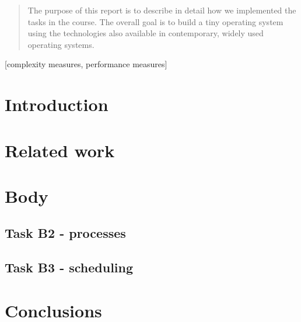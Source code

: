 \documentclass{acm_proc_article-sp}
\begin{document}
\maketitle
\begin{abstract}
The purpose of this report is to describe in detail how we implemented the tasks in the course. The overall goal is to build a tiny operating system using the technologies also available in contemporary, widely used operating systems.
\end{abstract}


[complexity measures, performance measures]



\section{Introduction}


\section{Related work}


\section{Body}



\subsection{Task B2 - processes}


\subsection{Task B3 - scheduling}


\section{Conclusions}

\end{document}
